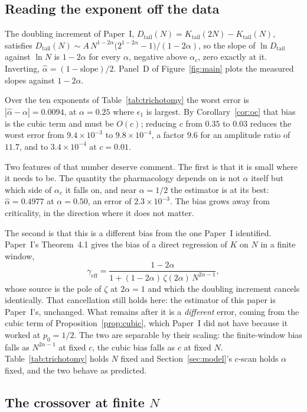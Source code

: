 \documentclass[11pt,reqno]{amsart}
\theoremstyle{plain}
\theoremstyle{definition}
\theoremstyle{remark}
\numberwithin{equation}{section}
\newcommand{\Kt}{K_{\mathrm{tail}}}
\newcommand{\Dt}{D_{\mathrm{tail}}}
\newcommand{\ac}{\alpha_c}
\begin{document}
\subsection{Reading the exponent off the data}
\label{sec:estimator}
The doubling increment of Paper~I, $\Dt(N)=\Kt(2N)-\Kt(N)$, satisfies $\Dt(N)\sim A\,N^{1-2\alpha}\bigl(2^{1-2\alpha}-1\bigr)/(1-2\alpha)$, so the slope of $\ln\Dt$ against $\ln N$ is $1-2\alpha$ for every $\alpha$, negative above $\ac$, zero exactly at it. Inverting, $\widehat\alpha = (1-\text{slope})/2$. Panel~D of Figure~\ref{fig:main} plots the measured slopes against $1-2\alpha$.

Over the ten exponents of Table~\ref{tab:trichotomy} the worst error is $|\widehat\alpha-\alpha| = 0.0094$, at $\alpha=0.25$ where $\epsilon_1$ is largest. By Corollary~\ref{cor:oc} that bias is the cubic term and must be $O(c)$; reducing $c$ from $0.35$ to $0.03$ reduces the worst error from $9.4\times10^{-3}$ to $9.8\times10^{-4}$, a factor $9.6$ for an amplitude ratio of $11.7$, and to $3.4\times10^{-4}$ at $c=0.01$.

Two features of that number deserve comment. The first is that it is small where it needs to be. The quantity the pharmacology depends on is not $\alpha$ itself but which side of $\ac$ it falls on, and near $\alpha=1/2$ the estimator is at its best: $\widehat\alpha=0.4977$ at $\alpha=0.50$, an error of $2.3\times10^{-3}$. The bias grows away from criticality, in the direction where it does not matter.

The second is that this is a different bias from the one Paper~I identified. Paper~I's Theorem~4.1 gives the bias of a direct regression of $K$ on $N$ in a finite window,
\[
\gamma_{\mathrm{eff}} = \frac{1-2\alpha}{1+(1-2\alpha)\,\zeta(2\alpha)\,N^{2\alpha-1}},
\]
whose source is the pole of $\zeta$ at $2\alpha=1$ and which the doubling increment cancels identically. That cancellation still holds here: the estimator of this paper is Paper~I's, unchanged. What remains after it is a \emph{different} error, coming from the cubic term of Proposition~\ref{prop:cubic}, which Paper~I did not have because it worked at $p_0=1/2$. The two are separable by their scaling: the finite-window bias falls as $N^{2\alpha-1}$ at fixed $c$, the cubic bias falls as $c$ at fixed $N$. Table~\ref{tab:trichotomy} holds $N$ fixed and Section~\ref{sec:model}'s $c$-scan holds $\alpha$ fixed, and the two behave as predicted.

\subsection{\texorpdfstring{The crossover at finite $N$}{The crossover at finite N}}
\end{document}
